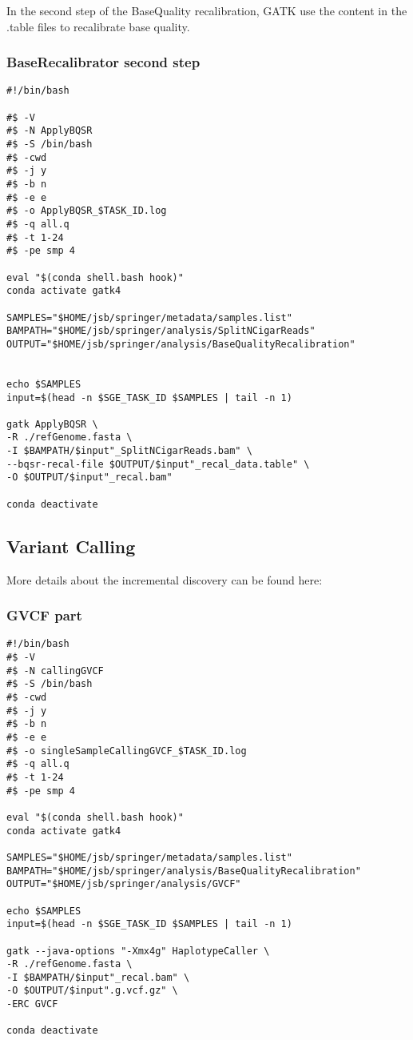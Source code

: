 In the second step of the BaseQuality recalibration, GATK use the content in the .table files to recalibrate base quality.


\subsubsection{BaseRecalibrator second step}
\begin{verbatim}
#!/bin/bash

#$ -V
#$ -N ApplyBQSR
#$ -S /bin/bash
#$ -cwd
#$ -j y
#$ -b n
#$ -e e
#$ -o ApplyBQSR_$TASK_ID.log
#$ -q all.q
#$ -t 1-24
#$ -pe smp 4

eval "$(conda shell.bash hook)"
conda activate gatk4

SAMPLES="$HOME/jsb/springer/metadata/samples.list"
BAMPATH="$HOME/jsb/springer/analysis/SplitNCigarReads"
OUTPUT="$HOME/jsb/springer/analysis/BaseQualityRecalibration"


echo $SAMPLES
input=$(head -n $SGE_TASK_ID $SAMPLES | tail -n 1)

gatk ApplyBQSR \
-R ./refGenome.fasta \
-I $BAMPATH/$input"_SplitNCigarReads.bam" \
--bqsr-recal-file $OUTPUT/$input"_recal_data.table" \
-O $OUTPUT/$input"_recal.bam"

conda deactivate
\end{verbatim}






\subsection{Variant Calling}

More details about the incremental discovery can be found here:

\subsubsection{GVCF part}
\begin{verbatim}
#!/bin/bash
#$ -V
#$ -N callingGVCF
#$ -S /bin/bash
#$ -cwd
#$ -j y
#$ -b n
#$ -e e
#$ -o singleSampleCallingGVCF_$TASK_ID.log
#$ -q all.q
#$ -t 1-24
#$ -pe smp 4

eval "$(conda shell.bash hook)"
conda activate gatk4

SAMPLES="$HOME/jsb/springer/metadata/samples.list"
BAMPATH="$HOME/jsb/springer/analysis/BaseQualityRecalibration"
OUTPUT="$HOME/jsb/springer/analysis/GVCF"

echo $SAMPLES
input=$(head -n $SGE_TASK_ID $SAMPLES | tail -n 1)

gatk --java-options "-Xmx4g" HaplotypeCaller \
-R ./refGenome.fasta \
-I $BAMPATH/$input"_recal.bam" \
-O $OUTPUT/$input".g.vcf.gz" \
-ERC GVCF

conda deactivate
\end{verbatim}





